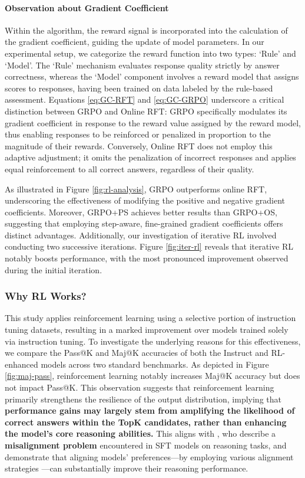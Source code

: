 \begin{itemize}[topsep=0pt]
\begin{itemize}[topsep=0pt]
\paragraph{Observation about Gradient Coefficient} Within the algorithm, the reward signal is incorporated into the calculation of the gradient coefficient, guiding the update of model parameters. In our experimental setup, we categorize the reward function into two types: `Rule' and `Model'. The `Rule' mechanism evaluates response quality strictly by answer correctness, whereas the `Model' component involves a reward model that assigns scores to responses, having been trained on data labeled by the rule-based assessment. Equations \ref{eq:GC-RFT} and \ref{eq:GC-GRPO} underscore a critical distinction between GRPO and Online RFT: GRPO specifically modulates its gradient coefficient in response to the reward value assigned by the reward model, thus enabling responses to be reinforced or penalized in proportion to the magnitude of their rewards. Conversely, Online RFT does not employ this adaptive adjustment; it omits the penalization of incorrect responses and applies equal reinforcement to all correct answers, regardless of their quality.

As illustrated in Figure \ref{fig:rl-analysis}, GRPO outperforms online RFT, underscoring the effectiveness of modifying the positive and negative gradient coefficients. Moreover, GRPO+PS achieves better results than GRPO+OS, suggesting that employing step-aware, fine-grained gradient coefficients offers distinct advantages. Additionally, our investigation of iterative RL involved conducting two successive iterations. Figure \ref{fig:iter-rl} reveals that iterative RL notably boosts performance, with the most pronounced improvement observed during the initial iteration.

\subsubsection{Why RL Works?} This study applies reinforcement learning using a selective portion of instruction tuning datasets, resulting in a marked improvement over models trained solely via instruction tuning. To investigate the underlying reasons for this effectiveness, we compare the Pass@K and Maj@K accuracies of both the Instruct and RL-enhanced models across two standard benchmarks. As depicted in Figure \ref{fig:maj-pass}, reinforcement learning notably increases Maj@K accuracy but does not impact Pass@K. This observation suggests that reinforcement learning primarily strengthens the resilience of the output distribution, implying that \textbf{performance gains may largely stem from amplifying the likelihood of correct answers within the TopK candidates, rather than enhancing the model's core reasoning abilities.} This aligns with \citep{wang2023making}, who describe a \textbf{misalignment problem} encountered in SFT models on reasoning tasks, and demonstrate that aligning models' preferences—by employing various alignment strategies \citep{yuan2023rrhf,song2023preference,wang2023making}—can substantially improve their reasoning performance.


\end{itemize}
\end{itemize}

